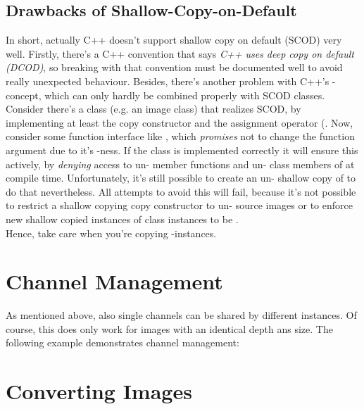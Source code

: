 
\subsection{Drawbacks of Shallow-Copy-on-Default}
In short, actually C++ doesn't support shallow copy on default (SCOD) very well. Firstly, there's a C++ convention that says \emph{C++ uses deep copy on default (DCOD)}, so breaking with that convention must be documented well to avoid really unexpected behaviour. Besides, there's another problem with C++'s -concept, which can only hardly be combined properly with SCOD classes. Consider there's a class  (e.g. an image class) that realizes SCOD, by implementing at least the copy constructor  and the assignment operator (. Now, consider some function interface like , which \emph{promises} not to change the function argument  due to it's -ness. If the class  is implemented correctly it will ensure this actively, by \emph{denying} access to un- member functions and un- class members of  at compile time. Unfortunately, it's still possible to create an un- shallow copy of  to do that nevertheless. All attempts to avoid this will fail, because it's not possible to restrict a shallow copying copy constructor to un- source images or to enforce new shallow copied instances of  class instances to be .\\
Hence, take care when you're copying -instances.



\section {Channel Management}

As mentioned above, also single channels can be shared by different  instances. Of course, this does only work for images with an identical depth ans size. The following example demonstrates channel management:



\section {Converting Images}

